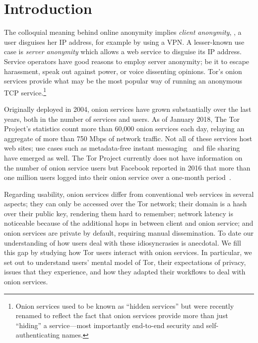 \section{Introduction}
\label{sec:introduction}

The colloquial meaning behind online anonymity implies \emph{client anonymity},
\ie, a user disguises her IP address, for example by using a VPN.  A
lesser-known use case is \emph{server anonymity} which allows a web service to
disguise its IP address.  Service operators have good reasons to employ server
anonymity; be it to escape harassment, speak out against power, or voice
dissenting opinions.  Tor's onion services provide what may be the most popular
way of running an anonymous TCP service.\footnote{Onion services used to be
known as ``hidden services'' but were recently renamed to reflect the fact
that onion services provide more than just ``hiding'' a service---most
importantly end-to-end security and self-authenticating names.}

Originally deployed in 2004, onion services have grown substantially over the
last years, both in the number of services and users.  As of January 2018, The
Tor Project's statistics count more than 60,000 onion services each day,
relaying an aggregate of more than 750 Mbps of network traffic.  Not all of
these services host web sites; use cases such as metadata-free instant
messaging~\cite{ricochet} and file sharing~\cite{onionshare} have emerged as
well.  The Tor Project currently does not have information on the number of
onion service users but Facebook reported in 2016 that more than one million
users logged into their onion service over a one-month
period~\cite{facebook-users}.

Regarding usability, onion services differ from conventional web services in
several aspects; \first they can only be accessed over the Tor network; \second
their domain is a hash over their public key, rendering them hard to remember;
\third network latency is noticeable because of the additional hops in between
client and onion service; and \fourth onion services are private by default,
requiring manual dissemination.  To date our understanding of how users deal
with these idiosyncrasies is anecdotal.  We fill this gap by studying how Tor
users interact with onion services.  In particular, we set out to understand
users' mental model of Tor, their expectations of privacy, issues that they
experience, and how they adapted their workflows to deal with onion services.

